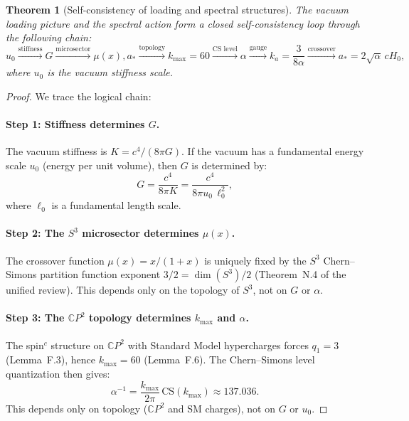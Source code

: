 \documentclass[11pt]{article}
\newtheorem{theorem}{Theorem}[section]
\begin{document}
\begin{theorem}[Self-consistency of loading and spectral structures]
\label{thm:self-consistency}
The vacuum loading picture and the spectral action form a closed
self-consistency loop through the following chain:
\begin{equation}
\boxed{
u_0 \xrightarrow{\text{stiffness}} G
\xrightarrow{\text{microsector}} \mu(x), a_*
\xrightarrow{\text{topology}} k_{\max} = 60
\xrightarrow{\text{CS level}} \alpha
\xrightarrow{\text{gauge}} k_a = \frac{3}{8\alpha}
\xrightarrow{\text{crossover}} a_* = 2\sqrt{\alpha}\,cH_0,
}
\end{equation}
where $u_0$ is the vacuum stiffness scale.
\end{theorem}

\begin{proof}
We trace the logical chain:

\paragraph{Step 1: Stiffness determines $G$.}
The vacuum stiffness is $K = c^4/(8\pi G)$.  If the vacuum has a fundamental
energy scale $u_0$ (energy per unit volume), then $G$ is determined by:
\begin{equation}
G = \frac{c^4}{8\pi K} = \frac{c^4}{8\pi u_0\, \ell_0^2},
\end{equation}
where $\ell_0$ is a fundamental length scale.

\paragraph{Step 2: The $S^3$ microsector determines $\mu(x)$.}
The crossover function $\mu(x) = x/(1+x)$ is uniquely fixed by the
$S^3$ Chern--Simons partition function exponent $3/2 = \dim(S^3)/2$
(Theorem~N.4 of the unified review).  This depends only on the
topology of $S^3$, not on $G$ or $\alpha$.

\paragraph{Step 3: The $\mathbb{C}P^2$ topology determines $k_{\max}$ and $\alpha$.}
The spin$^c$ structure on $\mathbb{C}P^2$ with Standard Model hypercharges
forces $q_1 = 3$ (Lemma~F.3), hence $k_{\max} = 60$ (Lemma~F.6).
The Chern--Simons level quantization then gives:
\begin{equation}
\alpha^{-1} = \frac{k_{\max}}{2\pi}\,\text{CS}(k_{\max})
\approx 137.036.
\end{equation}
This depends only on topology ($\mathbb{C}P^2$ and SM charges),
not on $G$ or $u_0$.


\end{proof}
\end{document}

